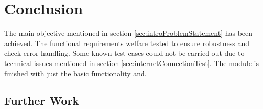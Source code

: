\newpage
\chapter{Conclusion}
    The main objective mentioned in section \ref{sec:introProblemStatement}
    has been achieved. The functional requirements welfare
    tested to ensure robustness and check error handling. Some known test cases 
    could not be carried out due to technical issues mentioned in
    section \ref{sec:internetConnectionTest}. The module is finished
    with just the basic functionality and. 
     
\section{Further Work}